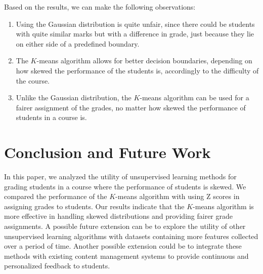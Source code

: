 \documentclass[conference]{IEEEtran}
\begin{document}
Based on the results, we can make the following observations:
\begin{enumerate}
    \item Using the Gaussian distribution is quite unfair, since there could be
    students with quite similar marks but with a difference in grade, just
    because they lie on either side of a predefined boundary.
    \item The $K$-means algorithm allows for better decision boundaries,
    depending on how skewed the performance of the students is, accordingly to
    the difficulty of the course.
    \item Unlike the Gaussian distribution, the $K$-means algorithm can be used
    for a fairer assignment of the grades, no matter how skewed the performance
    of students in a course is.
\end{enumerate}

\section{Conclusion and Future Work}
\label{sec:conclusion}

In this paper, we analyzed the utility of unsupervised learning methods for
grading students in a course where the performance of students is skewed. We
compared the performance of the $K$-means algorithm with using Z scores in
assigning grades to students. Our results indicate that the $K$-means algorithm
is more effective in handling skewed distributions and providing fairer grade
assignments. A possible future extension can be to explore the utility of other
unsupervised learning algorithms with datasets containing more features
collected over a period of time. Another possible extension could be to
integrate these methods with existing content management systems to provide
continuous and personalized feedback to students.



\end{document}
